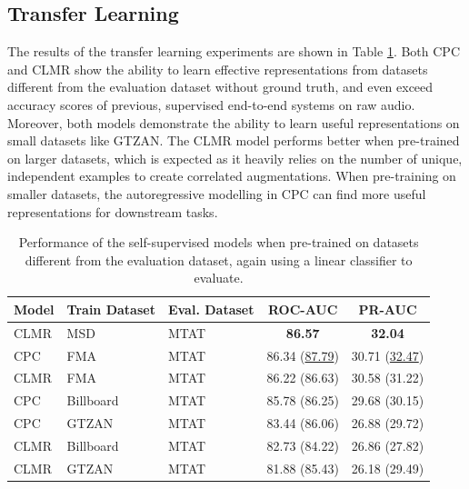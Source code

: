 \subsection{Transfer Learning}
The results of the transfer learning experiments are shown in Table \ref{tab:magnatagatune_results}. Both CPC and CLMR show the ability to learn effective representations from datasets different from the evaluation dataset without ground truth, and even exceed accuracy scores of previous, supervised end-to-end systems on raw audio\cite{dieleman2014end}. Moreover, both models demonstrate the ability to learn useful representations on small datasets like GTZAN. The CLMR model performs better when pre-trained on larger datasets, which is expected as it heavily relies on the number of unique, independent examples to create correlated augmentations. When pre-training on smaller datasets, the autoregressive modelling in CPC can find more useful representations for downstream tasks.

\begin{table}[t]
    \centering
    \begin{tabular}{@{}lllcc@{}}\toprule
        Model & Train Dataset & Eval. Dataset &  ROC-AUC & PR-AUC \\ \midrule
        CLMR & MSD & MTAT &  \textbf{86.57} & \textbf{32.04} \\
        CPC & FMA & MTAT & 86.34 (\underline{87.79}) & 30.71 (\underline{32.47}) \\
        CLMR & FMA & MTAT & 86.22 (86.63) & 30.58 (31.22) \\
        CPC & Billboard & MTAT & 85.78 (86.25) & 29.68 (30.15) \\
        CPC & GTZAN & MTAT & 83.44 (86.06) & 26.88 (29.72) \\
        CLMR & Billboard & MTAT & 82.73 (84.22) & 26.86 (27.82) \\
        CLMR & GTZAN & MTAT & 81.88 (85.43) & 26.18 (29.49) \\
        \bottomrule
    \end{tabular}
    \caption{Performance of the self-supervised models when pre-trained on datasets different from the evaluation dataset, again using a linear classifier to evaluate.}
    \label{tab:magnatagatune_results}
\end{table}



